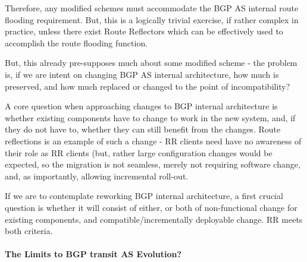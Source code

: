 Therefore, any modified schemes must accommodate the BGP AS internal route flooding requirement.  But, this is a logically trivial exercise, if rather complex in practice, unless there exist Route Reflectors which can be effectively used to accomplish the route flooding function.

But, this already pre-supposes much about some modified scheme - the problem is, if we are intent on changing BGP AS internal architecture, how much is preserved, and how much replaced or changed to the point of incompatibility?

A core question when approaching changes to BGP internal architecture is whether existing components have to change to work in the new system, and, if they do not have to, whether they can still benefit from the changes.  Route reflections is an example of such a change - RR clients need have no awareness of their role as RR clients (but, rather large configuration changes would be expected, so the migration is not seamless, merely not requiring software change, and, as importantly, allowing incremental roll-out.

If we are to contemplate reworking BGP internal architecture, a first crucial question is whether it will consist of either, or both of non-functional change for existing components, and compatible/incrementally deployable change.  RR meets both criteria.

\paragraph{The Limits to BGP transit AS Evolution?}

